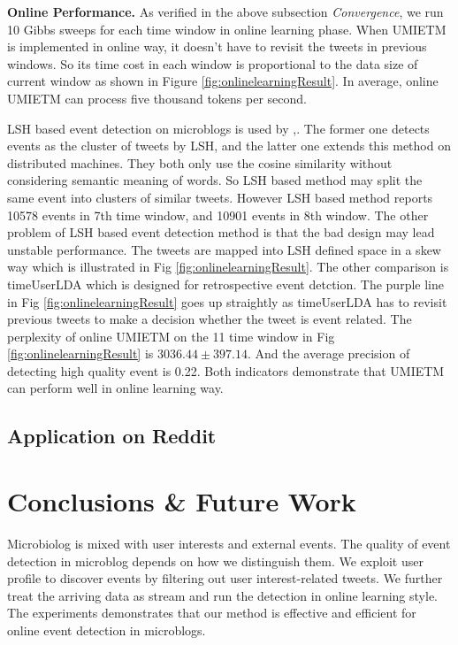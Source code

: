 \documentclass[conference,compsoc]{IEEEtran}
\begin{document}
\textbf{Online Performance.}
As verified in the above subsection \textit{Convergence}, we run 10 Gibbs sweeps for each time window in online learning phase.
When UMIETM is implemented in online way, it doesn't have to revisit the tweets in previous windows. 
So its time cost in each window is proportional to the data size of current window  as shown in Figure \ref{fig:onlinelearningResult}.
In average, online UMIETM can process five thousand tokens per second.

LSH based event detection on microblogs is used by \cite{petrovic2010streaming},\cite{mccreadiescalable}. 
The former one detects events as the cluster of tweets by LSH, and the latter one extends this method on distributed machines. 
They both only use the cosine similarity without considering semantic meaning of words. 
So LSH based method may split the same event into clusters of similar tweets.
However LSH based method reports 10578 events in 7th time window, and 10901 events in 8th window. 
The other problem of LSH based event detection method is that the bad design may lead unstable performance. 
The tweets are mapped into LSH defined space in a skew way which is illustrated in Fig \ref{fig:onlinelearningResult}.
The other comparison is timeUserLDA which is designed for retrospective event detction. 
The purple line in Fig \ref{fig:onlinelearningResult} goes up straightly as timeUserLDA has to revisit previous tweets to make a decision whether the tweet is event related. 
The perplexity of online UMIETM on the 11 time window in Fig \ref{fig:onlinelearningResult} is \(3036.44\pm397.14\). 
And the average precision of detecting high quality event is 0.22.
Both indicators demonstrate that UMIETM can perform well in online learning way. 
\subsection{Application on Reddit}

\section{Conclusions \& Future Work}
Microbiolog is mixed with user interests and external events.
The quality of event detection in microblog depends on how we distinguish them.
We exploit user profile to discover events by filtering out user interest-related tweets.
We further treat the arriving data as stream and run the detection in online learning style.
The experiments demonstrates that our method is effective and efficient for online event detection in microblogs.
\end{document}
